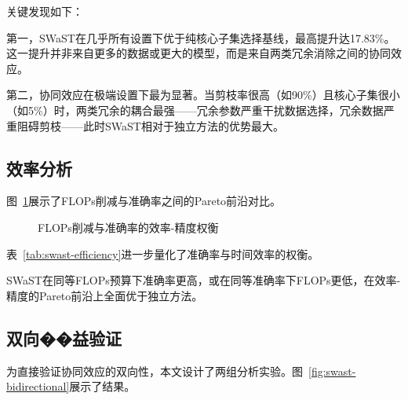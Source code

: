 关键发现如下：%

第一，SWaST在几乎所有设置下优于纯核心子集选择基线，最高提升达17.83\%。这一提升并非来自更多的数据或更大的模型，而是来自两类冗余消除之间的协同效应。

第二，协同效应在极端设置下最为显著。当剪枝率很高（如90\%）且核心子集很小（如5\%）时，两类冗余的耦合最强——冗余参数严重干扰数据选择，冗余数据严重阻碍剪枝——此时SWaST相对于独立方法的优势最大。

\subsection{效率分析}

图~\ref{fig:swast-pareto}展示了FLOPs削减与准确率之间的Pareto前沿对比。

\begin{figure}[htb]
  \centering
  \caption{FLOPs削减与准确率的效率-精度权衡}
  \label{fig:swast-pareto}
\end{figure}

表~\ref{tab:swast-efficiency}进一步量化了准确率与时间效率的权衡。

\begin{table}[htb]
  \centering
  \caption{准确率与时间效率对比}
  \label{tab:swast-efficiency}
\end{table}

SWaST在同等FLOPs预算下准确率更高，或在同等准确率下FLOPs更低，在效率-精度的Pareto前沿上全面优于独立方法。%

\subsection{双向��益验证}

为直接验证协同效应的双向性，本文设计了两组分析实验。图~\ref{fig:swast-bidirectional}展示了结果。

